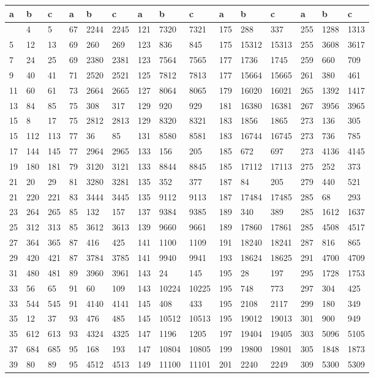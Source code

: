		\begin{longtable}{*4{A@{\hspace*{5mm}}A}} 
		\toprule
		a&b&c&a&b&c&a&b&c&a&b&c&a&b&c\\
		\midrule \endhead
		\bottomrule {}&4&5&67&2244&2245&121&7320&7321&175&288&337&255&1288&1313\\
	5&12&13&69&260&269&123&836&845&175&15312&15313&255&3608&3617\\
	7&24&25&69&2380&2381&123&7564&7565&177&1736&1745&259&660&709\\
	9&40&41&71&2520&2521&125&7812&7813&177&15664&15665&261&380&461\\
	11&60&61&73&2664&2665&127&8064&8065&179&16020&16021&265&1392&1417\\
	13&84&85&75&308&317&129&920&929&181&16380&16381&267&3956&3965\\
	15&8&17&75&2812&2813&129&8320&8321&183&1856&1865&273&136&305\\
	15&112&113&77&36&85&131&8580&8581&183&16744&16745&273&736&785\\
	17&144&145&77&2964&2965&133&156&205&185&672&697&273&4136&4145\\
	19&180&181&79&3120&3121&133&8844&8845&185&17112&17113&275&252&373\\
	21&20&29&81&3280&3281&135&352&377&187&84&205&279&440&521\\
	21&220&221&83&3444&3445&135&9112&9113&187&17484&17485&285&68&293\\
	23&264&265&85&132&157&137&9384&9385&189&340&389&285&1612&1637\\
	25&312&313&85&3612&3613&139&9660&9661&189&17860&17861&285&4508&4517\\
	27&364&365&87&416&425&141&1100&1109&191&18240&18241&287&816&865\\
	29&420&421&87&3784&3785&141&9940&9941&193&18624&18625&291&4700&4709\\
	31&480&481&89&3960&3961&143&24&145&195&28&197&295&1728&1753\\
	33&56&65&91&60&109&143&10224&10225&195&748&773&297&304&425\\
	33&544&545&91&4140&4141&145&408&433&195&2108&2117&299&180&349\\
	35&12&37&93&476&485&145&10512&10513&195&19012&19013&301&900&949\\
	35&612&613&93&4324&4325&147&1196&1205&197&19404&19405&303&5096&5105\\
	37&684&685&95&168&193&147&10804&10805&199&19800&19801&305&1848&1873\\
	39&80&89&95&4512&4513&149&11100&11101&201&2240&2249&309&5300&5309\\

\end{longtable}
